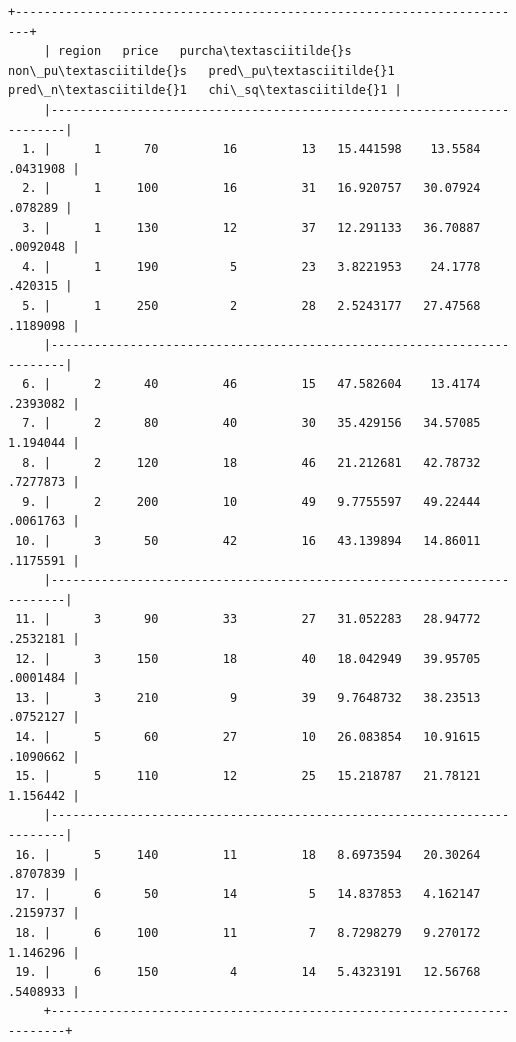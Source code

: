 \documentclass[11pt,notitlepage]{article}\usepackage[]{graphicx}\usepackage[]{color}
\makeatletter
\newenvironment{kframe}{%
 \def\at@end@of@kframe{}%
 \ifinner\ifhmode%
  \def\at@end@of@kframe{\end{minipage}}%
  \begin{minipage}{\columnwidth}%
 \fi\fi%
 \def\FrameCommand##1{\hskip\@totalleftmargin \hskip-\fboxsep
 \colorbox{shadecolor}{##1}\hskip-\fboxsep
     \hskip-\linewidth \hskip-\@totalleftmargin \hskip\columnwidth}%
 \MakeFramed {\advance\hsize-\width
   \@totalleftmargin\z@ \linewidth\hsize
   \@setminipage}}%
 {\par\unskip\endMakeFramed%
 \at@end@of@kframe}
\newenvironment{knitrout}{}{} %
\makeatother
\begin{document}
\begin{enumerate}[a)]
\begin{knitrout}
\begin{kframe}
\begin{footnotesize}
    \begin{Verbatim}[commandchars=\\\{\}]
     +------------------------------------------------------------------------+
     | region   price   purcha\textasciitilde{}s   non\_pu\textasciitilde{}s   pred\_pu\textasciitilde{}1   pred\_n\textasciitilde{}1   chi\_sq\textasciitilde{}1 |
     |------------------------------------------------------------------------|
  1. |      1      70         16         13   15.441598    13.5584   .0431908 |
  2. |      1     100         16         31   16.920757   30.07924    .078289 |
  3. |      1     130         12         37   12.291133   36.70887   .0092048 |
  4. |      1     190          5         23   3.8221953    24.1778    .420315 |
  5. |      1     250          2         28   2.5243177   27.47568   .1189098 |
     |------------------------------------------------------------------------|
  6. |      2      40         46         15   47.582604    13.4174   .2393082 |
  7. |      2      80         40         30   35.429156   34.57085   1.194044 |
  8. |      2     120         18         46   21.212681   42.78732   .7277873 |
  9. |      2     200         10         49   9.7755597   49.22444   .0061763 |
 10. |      3      50         42         16   43.139894   14.86011   .1175591 |
     |------------------------------------------------------------------------|
 11. |      3      90         33         27   31.052283   28.94772   .2532181 |
 12. |      3     150         18         40   18.042949   39.95705   .0001484 |
 13. |      3     210          9         39   9.7648732   38.23513   .0752127 |
 14. |      5      60         27         10   26.083854   10.91615   .1090662 |
 15. |      5     110         12         25   15.218787   21.78121   1.156442 |
     |------------------------------------------------------------------------|
 16. |      5     140         11         18   8.6973594   20.30264   .8707839 |
 17. |      6      50         14          5   14.837853   4.162147   .2159737 |
 18. |      6     100         11          7   8.7298279   9.270172   1.146296 |
 19. |      6     150          4         14   5.4323191   12.56768   .5408933 |
     +------------------------------------------------------------------------+



\end{Verbatim}
\end{footnotesize}
\end{kframe}
\end{knitrout}
\end{enumerate}
\end{document}
